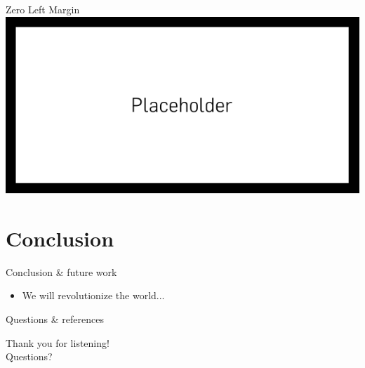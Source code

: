 \documentclass[compress,aspectratio=169]{beamer}
\newlength\beamerleftmargin
\newcommand{\zeroleftmargin}{%
	\hspace*{-\beamerleftmargin}%
}
\begin{document}
\begin{frame}{Zero Left Margin}
	\zeroleftmargin\includegraphics[width=\paperwidth]{placeholder}

\end{frame}

\section{Conclusion}

\begin{frame}{Conclusion \& future work}
	\begin{itemize}
		\item We will revolutionize the world...
	\end{itemize}

\end{frame}

\begin{frame}{Questions \& references}
	\begin{center}
		\LARGE
		Thank you for listening!\\ \vspace{10pt}Questions?
	\end{center}

\end{frame}
\end{document}
